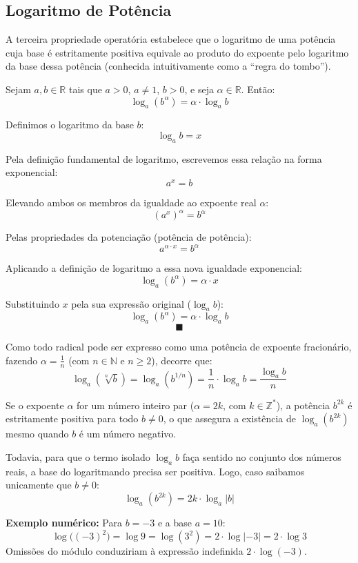 \documentclass[12pt,a4paper]{report}
\begin{document}
	\subsection{Logaritmo de Potência}
	
	A terceira propriedade operatória estabelece que o logaritmo de uma potência cuja base é estritamente positiva equivale ao produto do expoente pelo logaritmo da base dessa potência (conhecida intuitivamente como a ``regra do tombo'').
	
	\begin{destaque}
		Sejam $a, b \in \mathbb{R}$ tais que $a > 0$, $a \neq 1$, $b > 0$, e seja $\alpha \in \mathbb{R}$. Então:
		$$\log_a (b^\alpha) = \alpha \cdot \log_a b$$
	\end{destaque}
	
	\begin{destaque}[Demonstração]
		Definimos o logaritmo da base $b$:
		$$\log_a b = x$$
		
		Pela definição fundamental de logaritmo, escrevemos essa relação na forma exponencial:
		$$a^x = b$$
		
		Elevando ambos os membros da igualdade ao expoente real $\alpha$:
		$$(a^x)^\alpha = b^\alpha$$
		
		Pelas propriedades da potenciação (potência de potência):
		$$a^{\alpha \cdot x} = b^\alpha$$
		
		Aplicando a definição de logaritmo a essa nova igualdade exponencial:
		$$\log_a (b^\alpha) = \alpha \cdot x$$
		
		Substituindo $x$ pela sua expressão original ($\log_a b$):
		$$\log_a (b^\alpha) = \alpha \cdot \log_a b$$
		$$\blacksquare$$
	\end{destaque}
	
	\begin{destaque}
		Como todo radical pode ser expresso como uma potência de expoente fracionário, fazendo $\alpha = \frac{1}{n}$ (com $n \in \mathbb{N}$ e $n \geqslant 2$), decorre que:
		$$\log_a (\sqrt[n]{b}) = \log_a \left(b^{1/n}\right) = \frac{1}{n} \cdot \log_a b = \frac{\log_a b}{n}$$
	\end{destaque}
	
	\begin{destaque}
		Se o expoente $\alpha$ for um número inteiro par ($\alpha = 2k$, com $k \in \mathbb{Z}^*$), a potência $b^{2k}$ é estritamente positiva para todo $b \neq 0$, o que assegura a existência de $\log_a (b^{2k})$ mesmo quando $b$ é um número negativo.
		
		Todavia, para que o termo isolado $\log_a b$ faça sentido no conjunto dos números reais, a base do logaritmando precisa ser positiva. Logo, caso saibamos unicamente que $b \neq 0$:
		$$\log_a (b^{2k}) = 2k \cdot \log_a |b|$$
		
		\textbf{Exemplo numérico:}  
		Para $b = -3$ e a base $a = 10$:
		$$\log \bigl((-3)^2\bigr) = \log 9 = \log(3^2) = 2 \cdot \log |-3| = 2 \cdot \log 3$$
		Omissões do módulo conduziriam à expressão indefinida $2 \cdot \log(-3)$.
	\end{destaque}
	
\end{document}
